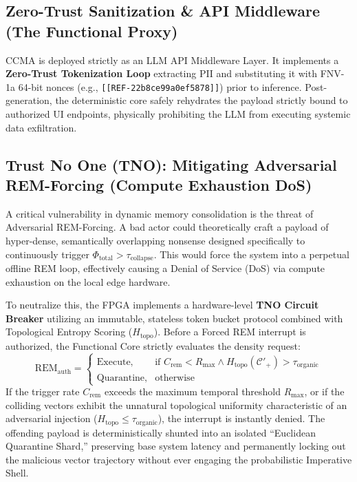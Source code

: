 \documentclass[11pt, a4paper]{article}
\begin{document}
	\subsection{Zero-Trust Sanitization \& API Middleware (The Functional Proxy)}
	CCMA is deployed strictly as an LLM API Middleware Layer. It implements a \textbf{Zero-Trust Tokenization Loop} extracting PII and substituting it with FNV-1a 64-bit nonces (e.g., \texttt{[[REF-22b8ce99a0ef5878]]}) prior to inference. Post-generation, the deterministic core safely rehydrates the payload strictly bound to authorized UI endpoints, physically prohibiting the LLM from executing systemic data exfiltration.

	\subsection{Trust No One (TNO): Mitigating Adversarial REM-Forcing (Compute Exhaustion DoS)}
	A critical vulnerability in dynamic memory consolidation is the threat of Adversarial REM-Forcing. A bad actor could theoretically craft a payload of hyper-dense, semantically overlapping nonsense designed specifically to continuously trigger $\Phi_{\text{total}} > \tau_{\text{collapse}}$. This would force the system into a perpetual offline REM loop, effectively causing a Denial of Service (DoS) via compute exhaustion on the local edge hardware.
	
	To neutralize this, the FPGA implements a hardware-level \textbf{TNO Circuit Breaker} utilizing an immutable, stateless token bucket protocol combined with Topological Entropy Scoring ($H_{\text{topo}}$). Before a Forced REM interrupt is authorized, the Functional Core strictly evaluates the density request:
	\begin{equation}
		\text{REM}_{\text{auth}} = 
		\begin{cases} 
			\text{Execute}, & \text{if } C_{\text{rem}} < R_{\text{max}} \land H_{\text{topo}}(\mathcal{C}'_{+}) > \tau_{\text{organic}} \\
			\text{Quarantine}, & \text{otherwise}
		\end{cases}
	\end{equation}
	If the trigger rate $C_{\text{rem}}$ exceeds the maximum temporal threshold $R_{\text{max}}$, or if the colliding vectors exhibit the unnatural topological uniformity characteristic of an adversarial injection ($H_{\text{topo}} \leq \tau_{\text{organic}}$), the interrupt is instantly denied. The offending payload is deterministically shunted into an isolated ``Euclidean Quarantine Shard,'' preserving base system latency and permanently locking out the malicious vector trajectory without ever engaging the probabilistic Imperative Shell.
\end{document}
